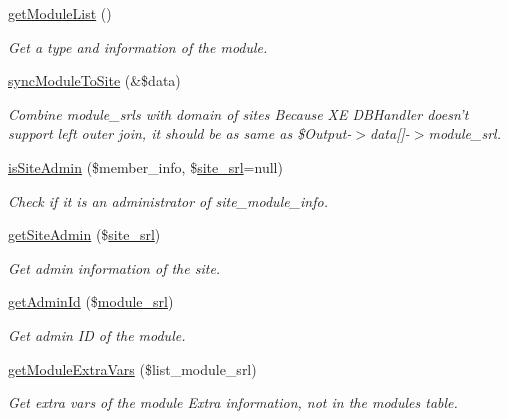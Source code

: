 \begin{DoxyCompactItemize}
\item 
\hyperlink{classmoduleModel_af51708f2ce0243f482bc92a453dd27c4}{get\-Module\-List} ()
\begin{DoxyCompactList}\small\item\em Get a type and information of the module. \end{DoxyCompactList}\item 
\hyperlink{classmoduleModel_ab51d556817682d653b92e09a34b138d6}{sync\-Module\-To\-Site} (\&\$data)
\begin{DoxyCompactList}\small\item\em Combine module\-\_\-srls with domain of sites Because X\-E D\-B\-Handler doesn't support left outer join, it should be as same as \$\-Output-\/$>$data\mbox{[}\mbox{]}-\/$>$module\-\_\-srl. \end{DoxyCompactList}\item 
\hyperlink{classmoduleModel_aae55c42d2818ffd09f81d6cb215c59ff}{is\-Site\-Admin} (\$member\-\_\-info, \$\hyperlink{ko_8install_8php_a8b1406b4ad1048041558dce6bfe89004}{site\-\_\-srl}=null)
\begin{DoxyCompactList}\small\item\em Check if it is an administrator of site\-\_\-module\-\_\-info. \end{DoxyCompactList}\item 
\hyperlink{classmoduleModel_a6baa2faf83fc96fba51072276c9cb7c3}{get\-Site\-Admin} (\$\hyperlink{ko_8install_8php_a8b1406b4ad1048041558dce6bfe89004}{site\-\_\-srl})
\begin{DoxyCompactList}\small\item\em Get admin information of the site. \end{DoxyCompactList}\item 
\hyperlink{classmoduleModel_a302d180d2acef6331f9123d60f76c8c1}{get\-Admin\-Id} (\$\hyperlink{ko_8install_8php_a370bb6450fab1da3e0ed9f484a38b761}{module\-\_\-srl})
\begin{DoxyCompactList}\small\item\em Get admin I\-D of the module. \end{DoxyCompactList}\item 
\hyperlink{classmoduleModel_a4e93226573048a7b9c8e2cb842d0cb30}{get\-Module\-Extra\-Vars} (\$list\-\_\-module\-\_\-srl)
\begin{DoxyCompactList}\small\item\em Get extra vars of the module Extra information, not in the modules table. \end{DoxyCompactList}\item 

\end{DoxyCompactItemize}
